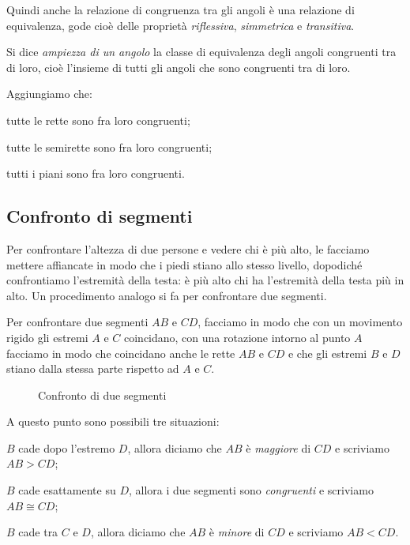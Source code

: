 Quindi anche la relazione di congruenza tra gli angoli è una 
relazione di equivalenza, gode cioè delle proprietà 
\emph{riflessiva}, \emph{simmetrica} e \emph{transitiva}.

\begin{definizione}
Si dice \emph{ampiezza di un angolo} la classe di equivalenza degli 
angoli congruenti tra di loro, cioè l'insieme di tutti gli angoli che 
sono congruenti tra di loro.
\end{definizione}

Aggiungiamo che:
\begin{itemize*}
\item tutte le rette sono fra loro congruenti;
\item tutte le semirette sono fra loro congruenti;
\item tutti i piani sono fra loro congruenti.
\end{itemize*}

\subsection{Confronto di segmenti}

Per confrontare l'altezza di due persone e vedere chi è più alto, le 
facciamo mettere affiancate in modo che i piedi stiano allo stesso 
livello, dopodiché confrontiamo l'estremità della testa: è più alto 
chi ha l'estremità della testa più in alto. Un procedimento analogo 
si fa per confrontare due segmenti.

Per confrontare due segmenti \(AB\) e \(CD\), facciamo in modo che con un 
movimento rigido gli estremi \(A\) e \(C\) coincidano, con una rotazione 
intorno al punto \(A\) facciamo in  modo che coincidano anche le rette 
\(AB\) e \(CD\) e che gli estremi \(B\) e \(D\) stiano dalla stessa parte 
rispetto ad \(A\) e \(C\).


\begin{inaccessibleblock}
 \begin{figure}[htb]
\centering
\caption{Confronto di due segmenti}
\end{figure}
\end{inaccessibleblock}

A questo punto sono possibili tre situazioni:
\begin{itemize*}
\item \(B\) cade dopo l'estremo \(D\), allora diciamo che \(AB\) è 
\emph{maggiore} di \(CD\) e scriviamo \(AB>CD\);
\item \(B\) cade esattamente su \(D\), allora i due segmenti sono 
\emph{congruenti} e scriviamo \(AB\cong CD\);
\item \(B\) cade tra \(C\) e \(D\), allora diciamo che \(AB\) è \emph{minore} 
di \(CD\) e scriviamo \(AB<CD\).
\end{itemize*}

